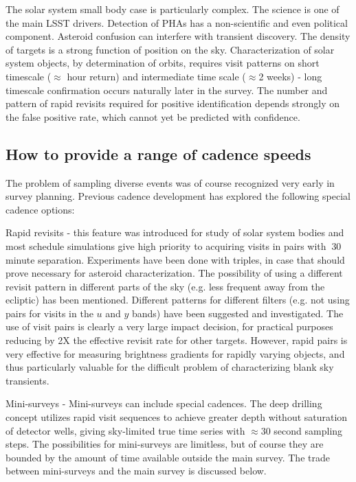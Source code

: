 The solar system small body case is particularly complex.  The science
is one of the main LSST drivers.  Detection of PHAs has a non-scientific
and even political component. Asteroid confusion can interfere with
transient discovery. The density of targets is a strong function of
position on the sky.  Characterization of solar system objects, by
determination of orbits, requires visit patterns on short timescale
($\approx$ hour return) and intermediate time scale ($\approx$2 weeks) -
long timescale confirmation occurs naturally later in the survey.  The
number and pattern of rapid revisits required for positive
identification depends strongly on the false positive rate, which cannot
yet be predicted with confidence.

\subsection{How to provide a range of cadence speeds}

The problem of sampling diverse events was of course recognized very
early in survey planning. Previous cadence development has explored the
following special cadence options:

Rapid revisits - this feature was introduced for study of solar system
bodies and most schedule simulations give high priority to acquiring
visits in pairs with $~$30 minute separation.  Experiments have been
done with triples, in case that should prove necessary for asteroid
characterization.  The possibility of using a different revisit pattern
in different parts of the sky (e.g. less frequent away from the
ecliptic) has been mentioned.  Different patterns for different filters
(e.g. not using pairs for visits in the $u$ and $y$ bands) have been 
suggested and investigated. The use of visit pairs is clearly a very large impact
decision, for practical purposes reducing by 2X the effective revisit
rate for other targets. However, rapid pairs is very effective for
measuring brightness gradients for rapidly varying objects, and thus
particularly valuable for the difficult problem of characterizing blank
sky transients.

Mini-surveys -  Mini-surveys can include special cadences. The deep
drilling concept utilizes rapid visit sequences to achieve greater depth
without saturation of detector wells, giving sky-limited true time
series with $\approx$30 second sampling steps.  The possibilities for
mini-surveys are limitless, but of course they are bounded by the amount
of time available outside the main survey. The trade between
mini-surveys and the main survey is discussed below.

